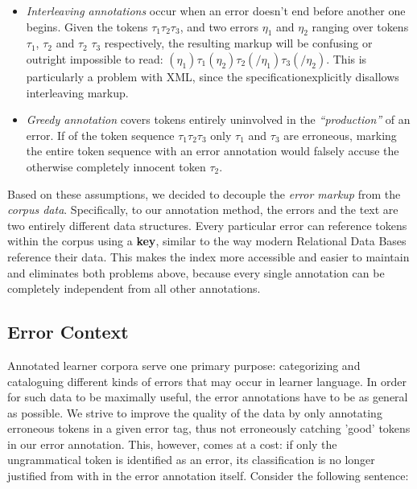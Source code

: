\documentclass[12pt]{article}
\begin{document}
\begin{itemize}
\item \textit{Interleaving annotations} occur when an error doesn't end before
another one begins. Given the tokens $\tau_1 \tau_2 \tau_3$, and two errors
$\eta_1$ and
$\eta_2$ ranging over tokens $\tau_1$, $\tau_2$ and $\tau_2$ $\tau_3$ respectively, the
resulting markup will be confusing or outright impossible to read: $(\eta_1)\tau_1
(\eta_2)\tau_2(/\eta_1)\tau_3(/\eta_2)$. This is particularly a problem with XML,
since the specification\footnotemark explicitly disallows interleaving
markup.
\item \textit{Greedy annotation} covers tokens entirely uninvolved in the
\textit{``production''} of an error. If of the token sequence $\tau_1 \tau_2
\tau_3$ only $\tau_1$
and $\tau_3$ are erroneous,
marking the entire token sequence with an error annotation would falsely accuse
the
otherwise completely innocent token $\tau_2$.
\end{itemize}

Based on these assumptions, we decided to decouple the \textit{error markup}
from the \textit{corpus data}. Specifically, to our annotation method, the
errors and the text are two entirely different data structures. Every
particular error can reference tokens within the corpus using a \textbf{key},
similar to the way modern Relational Data Bases reference their data. This makes
the index more accessible and easier to maintain and eliminates both problems
above, because every single annotation can be completely independent from all
other annotations.

\subsection{Error Context}

Annotated learner corpora serve one primary purpose: categorizing and
cataloguing different kinds of errors that may occur in learner language. In
order for such data to be maximally useful, the error annotations have to be as
general as possible. We strive to improve the quality of the data by only
annotating erroneous tokens in a given error tag, thus not erroneously catching
'good' tokens in our error annotation. This, however, comes at a cost: if only
the ungrammatical token is identified as an error, its classification is no
longer justified from with in the error annotation itself. Consider the
following sentence:
\end{document}
